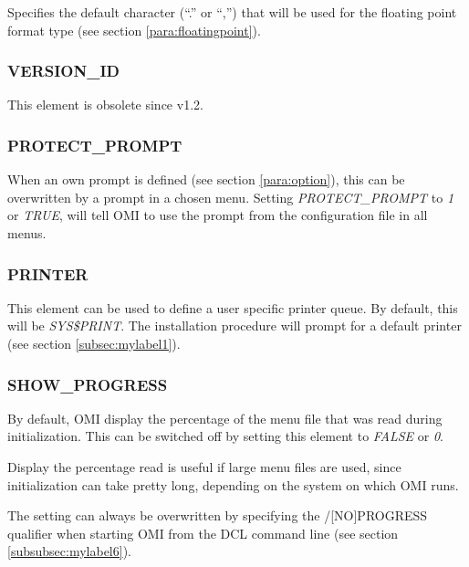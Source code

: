 \documentclass[a4paper]{book}
\newcommand{\vs}{\vspace{3mm}}
\begin{document}
Specifies the default character (``.'' or ``,'') that will be used for the 
floating point format type (see section \ref{para:floatingpoint}).

\subsubsection*{VERSION{\_}ID}

This element is obsolete since v1.2.

\subsubsection{PROTECT{\_}PROMPT}
\label{para:protect}

When an own prompt is defined (see section \ref{para:option}),
this can be overwritten by a prompt in a chosen menu. Setting 
\linebreak\textsl{PROTECT{\_}PROMPT} to \textsl{1} or \textsl{TRUE}, will tell OMI to use the prompt from 
the configuration file in all menus.

\subsubsection{PRINTER}

This element can be used to define a user specific printer queue. By 
default, this will be \textsl{SYS{\$}PRINT}. The installation procedure will prompt 
for a default printer (see section \ref{subsec:mylabel1}).

\subsubsection{SHOW{\_}PROGRESS}
\label{para:mylabel2}

By default, OMI display the percentage of the menu file that was read during 
initialization. This can be switched off by setting this element to \textsl{FALSE} or \textsl{0}.

\vs

Display the percentage read is useful if large menu files are used, since 
initialization can take pretty long, depending on the system on which OMI 
runs.

\vs

The setting can always be overwritten by specifying the \textsf{/[NO]PROGRESS} 
qualifier when starting OMI from the DCL command line (see section
\ref{subsubsec:mylabel6}).
\end{document}
